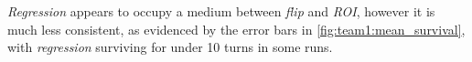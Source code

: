 \emph{Regression} appears to occupy a medium between \emph{flip} and \emph{ROI}, however it is much less consistent, as evidenced by the error bars in \autoref{fig:team1:mean_survival}, with \emph{regression} surviving for under 10 turns in some runs.

